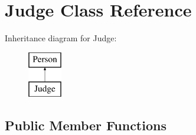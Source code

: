 \hypertarget{class_judge}{}\section{Judge Class Reference}
\label{class_judge}
Inheritance diagram for Judge\+:\begin{figure}[H]
\begin{center}
\leavevmode
\includegraphics[height=2.000000cm]{class_judge}
\end{center}
\end{figure}
\subsection*{Public Member Functions}
